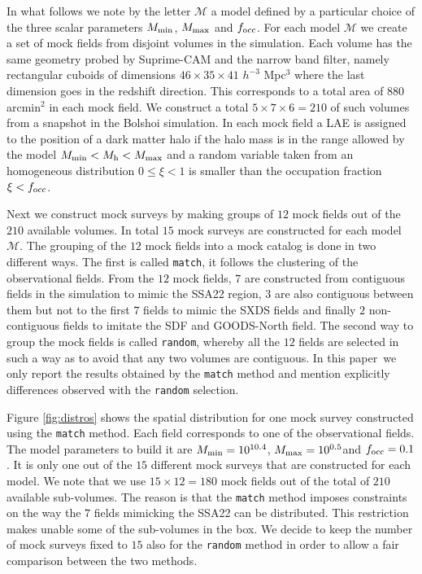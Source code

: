 \documentclass[usenatbib]{mn2e}
\newcommand{\documentname}{paper~}
\newcommand{\hMsun}{{\ifmmode{h^{-1}{\rm
        {M_{\odot}}}}\else{$h^{-1}{\rm{M_{\odot}}}$}\fi}}
\begin{document}
In what follows we note by the letter ${\mathcal M}$ a model
defined by a particular choice of the three scalar parameters $M_{\rm
  min}$, $M_{\rm  max}$ and $f_{\rm occ}$. For each model ${\mathcal
  M}$ we create a set of mock fields from disjoint volumes in the
simulation. Each volume has the same geometry probed by Suprime-CAM
and the narrow band filter, namely rectangular cuboids of dimensions
$46\times 35\times 41$ $h^{-3}$ Mpc$^{3}$ where the last dimension goes
in the redshift direction. This corresponds to a total area of $880$
arcmin$^{2}$ in each mock field. We construct a total $5\times 7
\times 6=210$ of such volumes from a snapshot in the Bolshoi
simulation. In each mock field a LAE is assigned to the position of a
dark matter halo if the halo mass is in the range allowed by the model
$M_{\rm min}<M_{\rm h}<M_{\rm max}$ and a random variable taken from
an homogeneous distribution $0\leq \xi<1$ is smaller than the occupation
fraction $\xi<f_{\rm occ}$.

Next we construct mock surveys by making groups of $12$ mock fields
out of the $210$ available volumes. In total $15$ mock surveys are
constructed for each model $\mathcal{M}$. The grouping of the $12$
mock fields into a mock catalog is done in two different ways. The
first is called {\texttt{match}}, it follows the clustering of the
observational fields. From the $12$ mock fields, $7$ are constructed
from contiguous fields in the simulation to mimic the SSA22 region,
$3$ are also contiguous between them but not to the first $7$ fields
to mimic the SXDS fields and finally $2$ non-contiguous fields to
imitate the SDF and GOODS-North field.   The second way to group the
mock fields is called {\texttt{random}}, whereby all the $12$ fields
are selected in such a way as to avoid that any two volumes are
contiguous. In this \documentname we only report the results obtained
by the {\texttt{match}} method and mention explicitly differences
observed with the {\texttt{random}} selection. 


Figure \ref{fig:distros} shows the spatial distribution for one mock
survey constructed using the {\texttt{match}} method. Each field
corresponds to one of the observational fields. The model parameters
to build it are $M_{\rm min}=10^{10.4}$\hMsun, $M_{\rm
  max}=10^{0.5}$\hMsun and $f_{\rm occ}=0.1$. It is only one out of
the $15$ different mock surveys that are constructed for each
model. We note that we use $15\times 12=180$ mock fields out of the
total of $210$ available sub-volumes. The reason is that the {\texttt{match}}
method imposes constraints on the way the $7$ fields mimicking the
SSA22 can be distributed. This restriction makes unable some of the
sub-volumes in the box. We decide to keep the number of mock surveys
fixed to $15$ also for the {\texttt{random}} method in order to allow a
fair comparison between the two methods.
\end{document}
